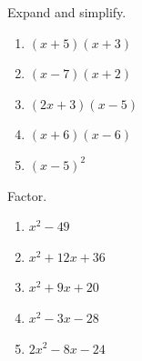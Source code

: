 \documentclass[11pt,a4paper]{article}
\newif\ifANSWERS
\newcommand{\ans}[1]{\ {\color{keyred}\bfseries #1}}
\newcommand{\ans}[1]{}
\begin{document}
Expand and simplify.
\begin{enumerate}[leftmargin=20pt,itemsep=7pt]
\item $(x+5)(x+3)$ \ifANSWERS\ans{$=x^2+8x+15$}\else\ \underline{\hspace{5.4cm}}\fi
\item $(x-7)(x+2)$ \ifANSWERS\ans{$=x^2-5x-14$ \ (the middle term is $2x-7x$)}\else\ \underline{\hspace{5.4cm}}\fi
\item $(2x+3)(x-5)$ \ifANSWERS\ans{$=2x^2-7x-15$ \ ($-10x+3x$)}\else\ \underline{\hspace{5.4cm}}\fi
\item $(x+6)(x-6)$ \ifANSWERS\ans{$=x^2-36$ \ (the $x$ terms cancel: difference of squares)}\else\ \underline{\hspace{5.4cm}}\fi
\item $(x-5)^2$ \ifANSWERS\ans{$=x^2-10x+25$, \emph{not} $x^2+25$}\else\ \underline{\hspace{5.4cm}}\fi
\end{enumerate}

\vspace{2pt}
Factor.
\begin{enumerate}[leftmargin=20pt,itemsep=7pt,start=6]
\item $x^2-49$ \ifANSWERS\ans{$=(x+7)(x-7)$}\else\ \underline{\hspace{5.4cm}}\fi
\item $x^2+12x+36$ \ifANSWERS\ans{$=(x+6)^2$ \ (a perfect square: $6+6=12$ and $6\times6=36$)}\else\ \underline{\hspace{5.4cm}}\fi
\item $x^2+9x+20$ \ifANSWERS\ans{$=(x+4)(x+5)$}\else\ \underline{\hspace{5.4cm}}\fi
\item $x^2-3x-28$ \ifANSWERS\ans{$=(x-7)(x+4)$ \ (multiply to $-28$, add to $-3$)}\else\ \underline{\hspace{5.4cm}}\fi
\item $2x^2-8x-24$ \ifANSWERS\ans{$=2(x-6)(x+2)$ \ (pull the 2 out first, then factor $x^2-4x-12$)}\else\ \underline{\hspace{5.4cm}}\fi
\end{enumerate}
\end{document}
